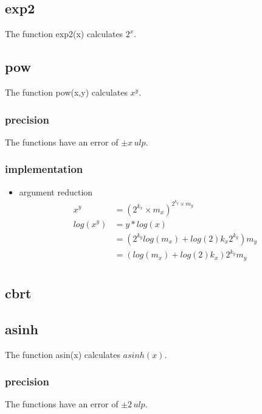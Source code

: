 \documentclass[10pt,a4paper,final,oneside]{article}
\numberwithin{equation}{subsection}
\begin{document}
\subsection{exp2}
The function exp2(x) calculates $ 2^x $.

\subsection{pow}
The function pow(x,y) calculates $ x^y $.

\subsubsection{precision}
The functions have an error of $ \pm x\, ulp$.

\subsubsection{implementation}
\begin{itemize}
\item argument reduction
    \begin{equation}
        \begin{aligned}
        x^y &= (2^{k_x} \times m_x) ^ {2^{k_y} \times m_y} \\
        log(x^y) &= y*log(x) \\
                 &= (2^{k_y} log(m_x) + log(2) k_x 2^{k_y}) m_y \\
                 &= (log(m_x) + log(2) k_x) 2^{k_y} m_y \\
        \end{aligned}
    \end{equation}
\end{itemize}

\subsection{cbrt}

\subsection{asinh}
\label{sub_sec:asin}
The function asin(x) calculates $ asinh(x) $.

\subsubsection{precision}
The functions have an error of $ \pm 2\, ulp$.
\end{document}
